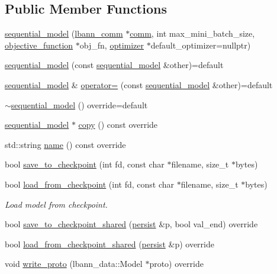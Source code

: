 \subsection*{Public Member Functions}
\begin{DoxyCompactItemize}
\item 
\hyperlink{classlbann_1_1sequential__model_a269f246d881186f8e8608dc4758cc6a6}{sequential\+\_\+model} (\hyperlink{classlbann_1_1lbann__comm}{lbann\+\_\+comm} $\ast$\hyperlink{file__io_8cpp_ab048c6f9fcbcfaa57ce68b00263dbebe}{comm}, int max\+\_\+mini\+\_\+batch\+\_\+size, \hyperlink{classlbann_1_1objective__function}{objective\+\_\+function} $\ast$obj\+\_\+fn, \hyperlink{classlbann_1_1optimizer}{optimizer} $\ast$default\+\_\+optimizer=nullptr)
\item 
\hyperlink{classlbann_1_1sequential__model_a03d6ed139f28f82411b5db7787c97ad2}{sequential\+\_\+model} (const \hyperlink{classlbann_1_1sequential__model}{sequential\+\_\+model} \&other)=default
\item 
\hyperlink{classlbann_1_1sequential__model}{sequential\+\_\+model} \& \hyperlink{classlbann_1_1sequential__model_a9714c99522b90488c486b390c5a7b6f3}{operator=} (const \hyperlink{classlbann_1_1sequential__model}{sequential\+\_\+model} \&other)=default
\item 
\hyperlink{classlbann_1_1sequential__model_ab56d457c38e89f6ea1c030168a018938}{$\sim$sequential\+\_\+model} () override=default
\item 
\hyperlink{classlbann_1_1sequential__model}{sequential\+\_\+model} $\ast$ \hyperlink{classlbann_1_1sequential__model_a548d44a9c4c6bec3680d60b20ac9bd73}{copy} () const override
\item 
std\+::string \hyperlink{classlbann_1_1sequential__model_abf2b69dacb5ee3165289377e1d961cd5}{name} () const override
\item 
bool \hyperlink{classlbann_1_1sequential__model_a51cd5ae859c66cfb36d25d968ef06203}{save\+\_\+to\+\_\+checkpoint} (int fd, const char $\ast$filename, size\+\_\+t $\ast$bytes)
\item 
bool \hyperlink{classlbann_1_1sequential__model_aa405c653dae867e862475e13b9df1db0}{load\+\_\+from\+\_\+checkpoint} (int fd, const char $\ast$filename, size\+\_\+t $\ast$bytes)
\begin{DoxyCompactList}\small\item\em Load model from checkpoint. \end{DoxyCompactList}\item 
bool \hyperlink{classlbann_1_1sequential__model_a226032d9890b8770c6fca54bf70d69eb}{save\+\_\+to\+\_\+checkpoint\+\_\+shared} (\hyperlink{classlbann_1_1persist}{persist} \&p, bool val\+\_\+end) override
\item 
bool \hyperlink{classlbann_1_1sequential__model_aa52cca299012c67f88483206d50abb21}{load\+\_\+from\+\_\+checkpoint\+\_\+shared} (\hyperlink{classlbann_1_1persist}{persist} \&p) override
\item 
void \hyperlink{classlbann_1_1sequential__model_a53a83327a1115a53affa78c93344e641}{write\+\_\+proto} (lbann\+\_\+data\+::\+Model $\ast$proto) override
\end{DoxyCompactItemize}
